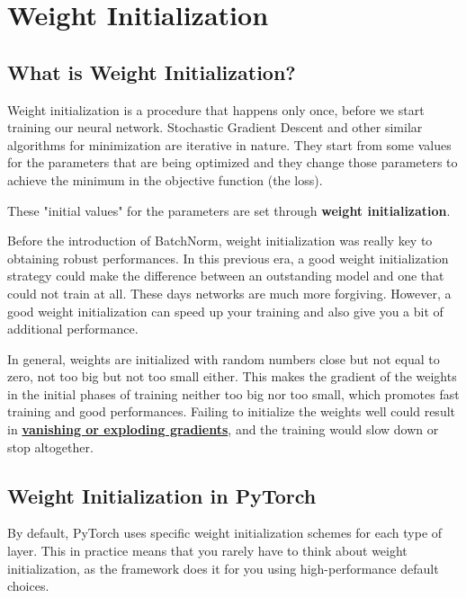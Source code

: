 \section{Weight Initialization}

\subsection{What is Weight Initialization?}

Weight initialization is a procedure that happens only once, before we start training our neural network. Stochastic Gradient Descent and other similar algorithms for minimization are iterative in nature. They start from some values for the parameters that are being optimized and they change those parameters to achieve the minimum in the objective function (the loss).\newline

These "initial values" for the parameters are set through \textbf{weight initialization}.\newline

Before the introduction of BatchNorm, weight initialization was really key to obtaining robust performances. In this previous era, a good weight initialization strategy could make the difference between an outstanding model and one that could not train at all. These days networks are much more forgiving. However, a good weight initialization can speed up your training and also give you a bit of additional performance.\newline

In general, weights are initialized with random numbers close but not equal to zero, not too big but not too small either. This makes the gradient of the weights in the initial phases of training neither too big nor too small, which promotes fast training and good performances. Failing to initialize the weights well could result in \href{https://en.wikipedia.org/wiki/Vanishing_gradient_problem}{\textbf{vanishing or exploding gradients}}, and the training would slow down or stop altogether.

\subsection{Weight Initialization in PyTorch}

By default, PyTorch uses specific weight initialization schemes for each type of layer. This in practice means that you rarely have to think about weight initialization, as the framework does it for you using high-performance default choices.\newline


